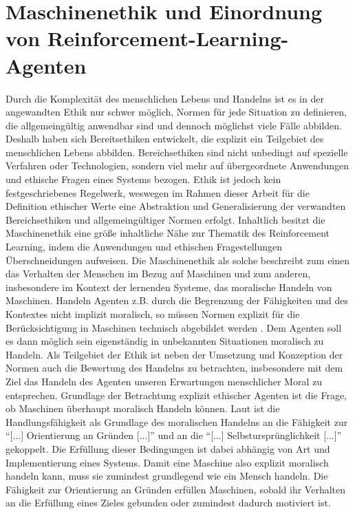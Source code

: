 \section{Maschinenethik und Einordnung von Reinforcement-Learning-Agenten}
Durch die Komplexität des menschlichen Lebens und Handelns ist es in der angewandten Ethik nur schwer möglich, Normen für jede Situation zu definieren, die allgemeingültig anwendbar sind und dennoch möglichst viele Fälle abbilden.
Deshalb haben sich Bereitsethiken entwickelt, die explizit ein Teilgebiet des menschlichen Lebens abbilden.
Bereichsethiken sind nicht unbedingt auf spezielle Verfahren oder Technologien, sondern viel mehr auf übergeordnete Anwendungen und ethische Fragen eines Systems bezogen.
Ethik ist jedoch kein festgeschriebenes Regelwerk, weswegen im Rahmen dieser Arbeit für die Definition ethischer Werte eine Abstraktion und Generalisierung der verwandten Bereichsethiken und allgemeingültiger Normen erfolgt.
\ab 
Inhaltlich besitzt die Maschinenethik \cite[S. 6]{rath2019} eine größe inhaltliche Nähe zur Thematik des Reinforcement Learning, indem die Anwendungen und ethischen Fragestellungen Überschneidungen aufweisen.
Die Maschinenethik als solche beschreibt zum einen das Verhalten der Menschen im Bezug auf Maschinen und zum anderen, insbesondere im Kontext der lernenden Systeme, das moralische Handeln von Maschinen.
Handeln Agenten z.B. durch die Begrenzung der Fähigkeiten und des Kontextes nicht implizit moralisch, so müssen Normen explizit für die Berücksichtigung in Maschinen  technisch abgebildet werden \cite[S. 34]{bendel2019}.
Dem Agenten soll es dann möglich sein eigenständig in unbekannten Situationen moralisch zu Handeln.
Als Teilgebiet der Ethik ist neben der Umsetzung und Konzeption der Normen auch die Bewertung des Handelns zu betrachten, insbesondere mit dem Ziel das Handeln des Agenten unseren Erwartungen menschlicher Moral zu entsprechen.
Grundlage der Betrachtung explizit ethischer Agenten ist die Frage, ob Maschinen überhaupt moralisch Handeln können.
Laut \cite[S. 41 ff.]{bendel2019} ist die Handlungsfähigkeit als Grundlage des moralischen Handelns an die Fähigkeit zur \enquote{[...] Orientierung an Gründen [...]} \cite[S. 41]{bendel2019} und an die \enquote{[...] Selbstursprünglichkeit [...]}\cite[S. 42]{bendel2019} gekoppelt.
Die Erfüllung dieser Bedingungen ist dabei abhängig von Art und Implementierung eines Systems.
Damit eine Maschine also explizit moralisch handeln kann, muss sie zumindest grundlegend wie ein Mensch handeln.
Die Fähigkeit zur Orientierung an Gründen erfüllen Maschinen, sobald ihr Verhalten an die Erfüllung eines Zieles gebunden oder zumindest dadurch motiviert ist.
